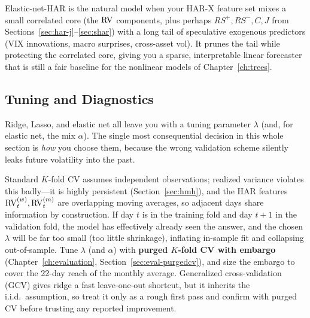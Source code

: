 \begin{projectconnection}
Elastic-net-HAR is the natural model when your HAR-X feature set mixes a small correlated core (the $\operatorname{RV}$ components, plus perhaps $RS^+,RS^-,C,J$ from Sections~\ref{sec:har-j}--\ref{sec:shar}) with a long tail of speculative exogenous predictors (VIX innovations, macro surprises, cross-asset vol).
It prunes the tail while protecting the correlated core, giving you a sparse, interpretable linear forecaster that is still a fair baseline for the nonlinear models of Chapter~\ref{ch:trees}.
\end{projectconnection}

\subsection{Tuning and Diagnostics}

Ridge, Lasso, and elastic net all leave you with a tuning parameter $\lambda$ (and, for elastic net, the mix $\alpha$).
The single most consequential decision in this whole section is \emph{how} you choose them, because the wrong validation scheme silently leaks future volatility into the past.

\begin{warning}
Standard $K$-fold CV assumes independent observations; realized variance violates this badly---it is highly persistent (Section~\ref{sec:hmh}), and the HAR features $\operatorname{RV}^{(w)}_t,\operatorname{RV}^{(m)}_t$ are overlapping moving averages, so adjacent days share information by construction.
If day $t$ is in the training fold and day $t+1$ in the validation fold, the model has effectively already seen the answer, and the chosen $\lambda$ will be far too small (too little shrinkage), inflating in-sample fit and collapsing out-of-sample.
Tune $\lambda$ (and $\alpha$) with \textbf{purged $K$-fold CV with embargo} (Chapter~\ref{ch:evaluation}, Section~\ref{sec:eval-purgedcv}), and size the embargo to cover the 22-day reach of the monthly average.
Generalized cross-validation (GCV) gives ridge a fast leave-one-out shortcut, but it inherits the i.i.d.\ assumption, so treat it only as a rough first pass and confirm with purged CV before trusting any reported improvement.
\end{warning}

